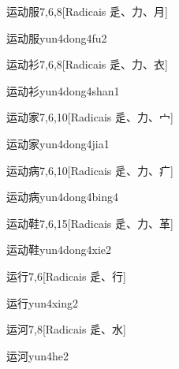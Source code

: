 \begin{entry}{运动服}{7,6,8}[Radicais ⾡、⼒、⽉]
  \begin{phonetics}{运动服}{yun4dong4fu2}
  \end{phonetics}
\end{entry}

\begin{entry}{运动衫}{7,6,8}[Radicais ⾡、⼒、⾐]
  \begin{phonetics}{运动衫}{yun4dong4shan1}
  \end{phonetics}
\end{entry}

\begin{entry}{运动家}{7,6,10}[Radicais ⾡、⼒、⼧]
  \begin{phonetics}{运动家}{yun4dong4jia1}
  \end{phonetics}
\end{entry}

\begin{entry}{运动病}{7,6,10}[Radicais ⾡、⼒、⽧]
  \begin{phonetics}{运动病}{yun4dong4bing4}
  \end{phonetics}
\end{entry}

\begin{entry}{运动鞋}{7,6,15}[Radicais ⾡、⼒、⾰]
  \begin{phonetics}{运动鞋}{yun4dong4xie2}
  \end{phonetics}
\end{entry}

\begin{entry}{运行}{7,6}[Radicais ⾡、⾏]
  \begin{phonetics}{运行}{yun4xing2}
  \end{phonetics}
\end{entry}

\begin{entry}{运河}{7,8}[Radicais ⾡、⽔]
  \begin{phonetics}{运河}{yun4he2}
  \end{phonetics}
\end{entry}

